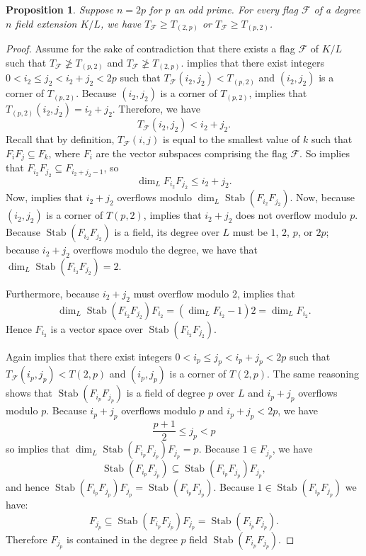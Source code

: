 \documentclass[letterpaper,10pt]{amsart}
\DeclareMathOperator{\Stab}{Stab}
\newcommand{\cF}{\mathcal{F}}
\newtheorem{proposition}[theorem]{Proposition}
\theoremstyle{definition}
\theoremstyle{remark}
\begin{document}
\begin{proposition}
\label{prop:2prefined}
Suppose $n = 2p$ for $p$ an odd prime. For every flag $\cF$ of a degree $n$ field extension $K/L$, we have $T_{\cF} \geq T_{(2,p)}$ or $T_{\cF} \geq T_{(p,2)}$.
\end{proposition}
\begin{proof}
Assume for the sake of contradiction that there exists a flag $\cF$ of $K/L$ such that $T_{\cF} \not \geq T_{(p,2)}$ and $T_{\cF} \not \geq T_{(2,p)}$.  implies that there exist integers $0 < i_2 \leq j_2 < i_2 + j_2 < 2p$ such that $T_{\cF}(i_2,j_2) < T_{(p,2)}$ and $(i_2,j_2)$ is a corner of $T_{(p,2)}$. Because  $(i_2,j_2)$ is a corner of $T_{(p,2)}$,  implies that $T_{(p,2)}(i_2,j_2) = i_2+j_2$. Therefore, we have
\begin{equation}
\label{eqn:2p-refined-1}
T_{\cF}(i_2,j_2) < i_2 + j_2.
\end{equation}
Recall that by definition, $T_{\cF}(i,j)$ is equal to the smallest value of $k$ such that $F_{i}F_j \subseteq F_k$, where $F_i$ are the vector subspaces comprising the flag $\cF$. So  implies that $F_{i_2}F_{j_2} \subseteq F_{i_2 + j_2 - 1}$, so 
\[
	\dim_{L}F_{i_2}F_{j_2} \leq i_2 + j_2.
\]
Now,  implies that $i_2 + j_2$ overflows modulo $\dim_{L}\Stab(F_{i_2}F_{j_2})$. Now, because  $(i_2,j_2)$ is a corner of $T(p,2)$,  implies that $i_2 + j_2$ does not overflow modulo $p$. Because $\Stab(F_{i_2}F_{j_2})$ is a field, its degree over $L$ must be $1$, $2$, $p$, or $2p$; because $i_2 + j_2$ overflows modulo the degree, we have that $\dim_{L}\Stab(F_{i_2}F_{j_2}) = 2$. 

Furthermore, because $i_2 + j_2$ must overflow modulo $2$,  implies that
\begin{equation}
\label{eqn:2p-refined-1-mod}
\dim_{L}\Stab(F_{i_2}F_{j_2})F_{i_2} = (\dim_{L}F_{i_2} - 1)2 = \dim_{L}F_{i_2}.
\end{equation}
Hence $F_{i_2}$ is a vector space over $\Stab(F_{i_2}F_{j_2})$.

Again  implies that there exist integers $0 < i_p \leq j_p < i_p + j_p < 2p$ such that $T_{\cF}(i_p,j_p) < T(2,p)$ and $(i_p,j_p)$ is a corner of $T(2,p)$. The same reasoning shows that $\Stab(F_{i_p}F_{j_p})$ is a field of degree $p$ over $L$ and $i_p + j_p$ overflows modulo $p$. Because $i_p + j_p$ overflows modulo $p$ and $i_p + j_p < 2p$, we have
\begin{equation}
\label{eqn:2p-refined-2}
\frac{p+1}{2} \leq j_p < p
\end{equation}
so  implies that $\dim_{L}\Stab(F_{i_p}F_{j_p})F_{j_p} = p$. Because $1 \in F_{j_p}$, we have
\[
    \Stab(F_{i_p}F_{j_p}) \subseteq \Stab(F_{i_p}F_{j_p})F_{j_p},
\]
and hence $\Stab(F_{i_p}F_{j_p})F_{j_p} = \Stab(F_{i_p}F_{j_p})$. Because $1 \in \Stab(F_{i_p}F_{j_p})$ we have:
\[
F_{j_p} \subseteq \Stab(F_{i_p}F_{j_p})F_{j_p} = \Stab(F_{i_p}F_{j_p}).
\]
Therefore $F_{j_p}$ is contained in the degree $p$ field $\Stab(F_{i_p}F_{j_p})$.


\end{proof}
\end{document}

